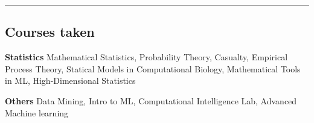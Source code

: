\documentclass[10pt,letterpaper]{article}
\newenvironment{indentsection}[1]%
{\begin{list}{}%
	{\setlength{\leftmargin}{#1}}%
	\item[]%
}
{\end{list}}
\begin{document}

\hrule
\vspace{-1em}
\subsection*{Courses taken}

\begin{indentsection}{\parindent}
\begin{description*}
	\item
	{\textbf{Statistics}}
	Mathematical Statistics, Probability Theory, Casualty, Empirical Process Theory, Statical Models in Computational Biology, Mathematical Tools in ML, High-Dimensional Statistics

	\item
	{\textbf{Others}}
	Data Mining, Intro to ML, Computational Intelligence Lab, Advanced Machine learning

\end{description*}
\end{indentsection}
\end{document}
